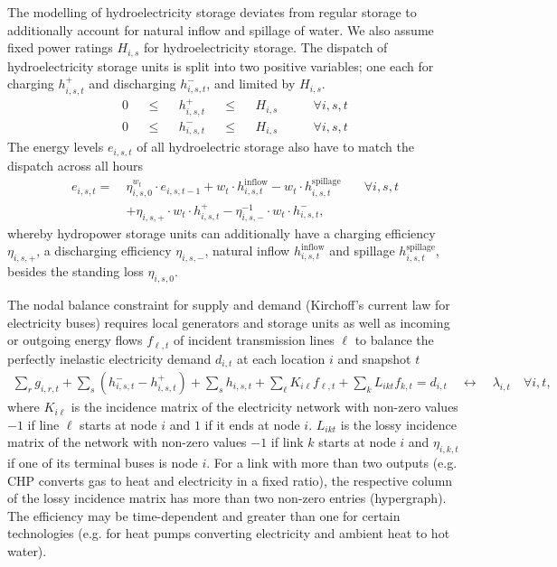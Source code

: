 The modelling of hydroelectricity storage deviates from regular storage to
additionally account for natural inflow and spillage of water. We also assume
fixed power ratings $H_{i,s}$ for hydroelectricity storage. The dispatch of
hydroelectricity storage units is split into two positive variables; one each
for charging $h_{i,s,t}^+$ and discharging $h_{i,s,t}^-$, and limited by
$H_{i,s}$.
\begin{align}
  0 &  & \leq &  & h_{i,s,t}^+ &  & \leq &  & H_{i,s} & \qquad\forall i, s, t \label{eq:sto1} \\
  0 &  & \leq &  & h_{i,s,t}^- &  & \leq &  & H_{i,s} & \qquad\forall i, s, t \label{eq:sto2}
\end{align}
The energy levels $e_{i,s,t}$ of all hydroelectric storage also have to match
the dispatch across all hours
\begin{align}
  e_{i,s,t} =\: & \eta_{i,s,0}^{w_t} \cdot e_{i,s,t-1} + w_t \cdot h_{i,s,t}^\text{inflow} - w_t \cdot h_{i,s,t}^\text{spillage} & \quad\forall i, s, t \nonumber \\
                & + \eta_{i,s,+} \cdot w_t \cdot h_{i,s,t}^+ - \eta_{i,s,-}^{-1} \cdot w_t \cdot h_{i,s,t}^-, \label{eq:stoe}
\end{align}
whereby hydropower storage units can additionally have a charging efficiency
$\eta_{i,s,+}$, a discharging efficiency $\eta_{i,s,-}$, natural inflow
$h_{i,s,t}^\text{inflow}$ and spillage $h_{i,s,t}^\text{spillage}$, besides the
standing loss $\eta_{i,s,0}$.

The nodal balance constraint for supply and demand (Kirchoff's current law for electricity
buses) requires local generators and storage units as well as incoming or
outgoing energy flows $f_{\ell,t}$ of incident transmission lines $\ell$ to
balance the perfectly inelastic electricity demand $d_{i,t}$ at each location
$i$ and snapshot $t$
\begin{align}
    \sum_r g_{i,r,t} + \sum_s \left(h_{i,s,t}^- - h_{i,s,t}^+ \right) + \sum_s h_{i,s,t} + \sum_\ell K_{i\ell} f_{\ell,t} + \sum_k L_{ikt} f_{k,t} = d_{i,t}  \quad \leftrightarrow \quad \lambda_{i,t} \quad \forall i,t,
\end{align}
where $K_{i\ell}$ is the incidence matrix of the electricity network with
non-zero values $-1$ if line $\ell$ starts at node $i$ and $1$ if it ends at
node $i$. $L_{ikt}$ is the lossy incidence matrix of the network with
non-zero values $-1$ if link $k$ starts at node $i$ and $\eta_{i,k,t}$ if one of
its terminal buses is node $i$. For a link with more than two outputs (e.g. CHP
converts gas to heat and electricity in a fixed ratio), the respective column of
the lossy incidence matrix has more than two non-zero entries (hypergraph). The
efficiency may be time-dependent and greater than one for certain technologies
(e.g. for heat pumps converting electricity and ambient heat to hot water).

